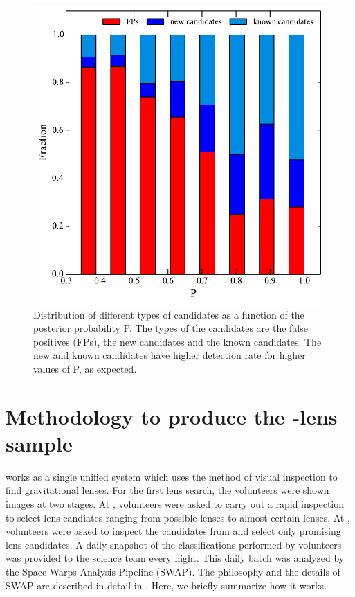 \documentclass[useAMS,usenatbib,a4paper]{mn2e}
\begin{document}
\begin{figure}
\begin{center}
\includegraphics[scale=0.6]{cand_fp_P_frac.pdf}
\caption{ \label{fig:stackP}
Distribution of different types of candidates as a function of the
posterior probability P. The types of the candidates are the false
positives (FPs), the new candidates and the known candidates. The new
and known candidates have higher detection rate for higher values of P,
as expected.}
\end{center}
\end{figure}


\section{Methodology to produce the \sw-\cfhtls lens sample}
\label{sec:swap}

\sw works as a single unified system which uses the method of visual
inspection to find gravitational lenses. For the first \sw lens search,
the volunteers were shown images at two stages. At \StageOne, volunteers
were asked to carry out a rapid inspection to select lens candiates
ranging from possible lenses to almost certain lenses. At \StageTwo,
volunteers were asked to inspect the candidates from \StageOne and select
only promising lens candidates. A daily snapshot of the classifications
performed by volunteers was provided to the science team every night.
This daily batch was analyzed by the Space Warps Analysis Pipeline
(SWAP). The philosophy and the details of SWAP are described in detail
in \PaperOne. Here, we briefly summarize how it works.
\end{document}
